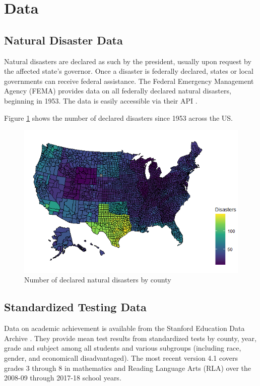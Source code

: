 
\section{Data}

\subsection{Natural Disaster Data}

Natural disasters are declared as such by the president, usually upon request by the affected state's governor. Once a disaster is federally declared, states or local governments can receive federal assistance. The Federal Emergency Management Agency (FEMA) provides data on all federally declared natural disasters, beginning in 1953. The data is easily accessible via their API \citep{rfema}.



Figure \ref{DisasterMap} shows the number of declared disasters since 1953 across the US.


\begin{figure}[!h]
	\centering
	\includegraphics[scale=0.7]{"../Code & Data/DisasterMap.png"}
	\caption{Number of declared natural disasters by county}
	\label{DisasterMap}
\end{figure}



\subsection{Standardized Testing Data}

Data on academic achievement is available from the Stanford Education Data Archive \citep{SEDA}. They provide mean test results from standardized tests by county, year, grade and subject among all students and various subgroups (including race, gender, and economicall disadvantaged). The most recent version 4.1 covers grades 3 through 8 in mathematics and Reading Language Arts (RLA) over the 2008-09 through 2017-18 school years.

